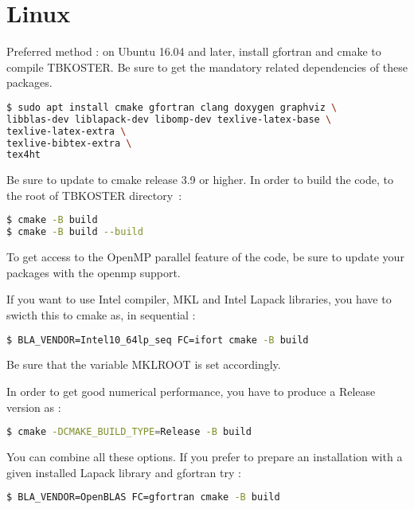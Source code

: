 \documentclass[12pt, onecolumn]{memoir}
\begin{document}
\section{Linux}
Preferred method : on Ubuntu 16.04 and later, install gfortran and cmake to compile TBKOSTER. Be sure to get the mandatory related dependencies of these packages.
\begin{lstlisting}[language=sh,basicstyle=\small]
$ sudo apt install cmake gfortran clang doxygen graphviz \
libblas-dev liblapack-dev libomp-dev texlive-latex-base \ 
texlive-latex-extra \ 
texlive-bibtex-extra \ 
tex4ht
\end{lstlisting}
Be sure to update to cmake release 3.9 or higher.
In order to build the code, to the root of TBKOSTER directory~:
\begin{lstlisting}[language=sh,basicstyle=\small]
$ cmake -B build
$ cmake -B build --build
\end{lstlisting}
To get access to the OpenMP parallel feature of the code, be sure to update your packages with the openmp support.

If you want to use Intel compiler, MKL and Intel Lapack libraries, you have to swicth this to cmake as, in sequential :
\begin{lstlisting}[language=sh,basicstyle=\small]
$ BLA_VENDOR=Intel10_64lp_seq FC=ifort cmake -B build
\end{lstlisting}
Be sure that the variable MKLROOT is set accordingly.

In order to get good numerical performance, you have to produce a Release version as :
\begin{lstlisting}[language=sh,basicstyle=\small]
$ cmake -DCMAKE_BUILD_TYPE=Release -B build
\end{lstlisting}
You can combine all these options.
If you prefer to prepare an installation with a given installed Lapack library and gfortran try :
\begin{lstlisting}[language=sh,basicstyle=\small]
$ BLA_VENDOR=OpenBLAS FC=gfortran cmake -B build
\end{lstlisting}
\end{document}
